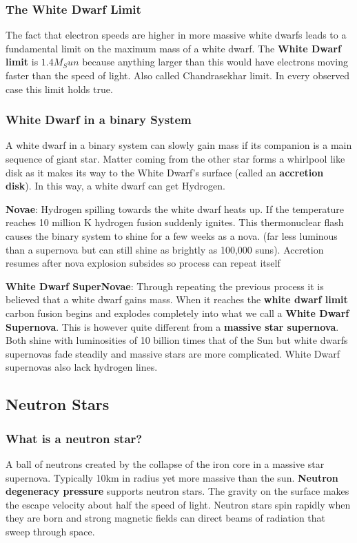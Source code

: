 \subsubsection{The White Dwarf Limit}
The fact that electron speeds are higher in more massive white dwarfs leads to a fundamental limit on the maximum mass of a white dwarf. The {\bf White Dwarf limit} is {\bf $1.4M_Sun$} because anything larger than this would have electrons moving faster than the speed of light. Also called Chandrasekhar limit. In every observed case this limit holds true.

\subsubsection{White Dwarf in a binary System}
A white dwarf in a binary system can slowly gain mass if its companion is a main sequence of giant star. Matter coming from the other star forms a whirlpool like disk as it makes its way to the White Dwarf's surface (called an {\bf accretion disk}). In this way, a white dwarf can get Hydrogen.

{\bf Novae}: Hydrogen spilling towards the white dwarf heats up. If the temperature reaches 10 million K hydrogen fusion suddenly ignites. This thermonuclear flash causes the binary system to shine for a few weeks as a nova. (far less luminous than a supernova but can still shine as brightly as 100,000 suns). Accretion resumes after nova explosion subsides so process can repeat itself

{\bf White Dwarf SuperNovae}: Through repeating the previous process it is believed that a white dwarf gains mass. When it reaches the {\bf white dwarf limit} carbon fusion begins and explodes completely into what we call a {\bf White Dwarf Supernova}. This is however quite different from a {\bf massive star supernova}. Both shine with luminosities of 10 billion times that of the Sun but white dwarfs supernovas fade steadily and massive stars are more complicated. White Dwarf supernovas also lack hydrogen lines.

\subsection{Neutron Stars}
\subsubsection{What is a neutron star?}
A ball of neutrons created by the collapse of the iron core in a massive star supernova. Typically 10km in radius yet more massive than the sun. {\bf Neutron degeneracy pressure} supports neutron stars. The gravity on the surface makes the escape velocity about half the speed of light. Neutron stars spin rapidly when they are born and strong magnetic fields can direct beams of radiation that sweep through space.

